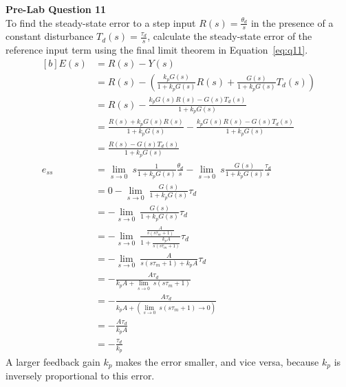 \documentclass[12pt]{article}
\begin{document}
\textbf{Pre-Lab Question 11} \\
To find the steady-state error to a step input $R(s) = \frac{\theta_d}{s}$ in the presence of a constant disturbance $T_d(s) = \frac{\tau_d}{s}$, calculate the steady-state error of the reference input term using the final limit theorem in Equation~\ref{eq:q11}.
\begin{equation} \label{eq:q11}
\begin{aligned}[b]
    E(s) &= R(s) - Y(s) \\
    &= R(s) - \left(\frac{k_pG(s)}{1 + k_pG(s)}R(s) + \frac{G(s)}{1 + k_pG(s)}T_d(s) \right) \\
    &= R(s) - \frac{k_pG(s)R(s) - G(s)T_d(s)}{1 + k_pG(s)} \\
    &= \frac{R(s) + k_pG(s)R(s)}{1 + k_pG(s)} - \frac{k_pG(s)R(s) - G(s)T_d(s)}{1 + k_pG(s)} \\
    &= \frac{R(s) - G(s)T_d(s)}{1 + k_pG(s)} \\
    e_{ss} &= \lim_{s \to 0} \ s \frac{1}{1 + k_pG(s)} \frac{\theta_d}{s} - \lim_{s \to 0} \ s \frac{G(s)}{1 + k_pG(s)} \frac{\tau_d}{s} \\
    &= 0 - \lim_{s \to 0} \ \frac{G(s)}{1 + k_pG(s)} \tau_d \\
    &= - \lim_{s \to 0} \ \frac{G(s)}{1 + k_pG(s)} \tau_d \\
    &= - \lim_{s \to 0} \ \frac{\frac{A}{s(s\tau_m + 1)}}{1 + \frac{k_pA}{s(s\tau_m + 1)}} \tau_d \\
    &= - \lim_{s \to 0} \ \frac{A}{s(s\tau_m + 1) + k_pA} \tau_d \\
    &= - \frac{A\tau_d}{k_pA + \lim_{s \to 0} \ s(s\tau_m + 1)} \\
    &= - \frac{A\tau_d}{k_pA + (\lim_{s \to 0} \ s(s\tau_m + 1) \to 0)} \\
    &= - \frac{A\tau_d}{k_pA} \\
    &= - \frac{\tau_d}{k_p}
\end{aligned}
\end{equation}
A larger feedback gain $k_p$ makes the error smaller, and vice versa, because $k_p$ is inversely proportional to this error.

\setcounter{section}{5}
\end{document}
